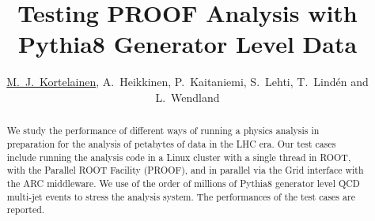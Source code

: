 \documentclass[twoside,floatfix,a4wide]{revtex4}
\begin{document}
\title{Testing PROOF Analysis with Pythia8 Generator Level Data}
\author{\underline{M.~J.~Kortelainen}, A.~Heikkinen, P.~Kaitaniemi, S.~Lehti,
  T.~Lind\'{e}n and L.~Wendland}

\begin{abstract}
  We study the performance of different ways of running a physics
  analysis in preparation for the analysis of petabytes of data in the
  LHC era. Our test cases include running the analysis code in a Linux
  cluster with a single thread in ROOT, with the Parallel ROOT
  Facility (PROOF), and in parallel via the Grid interface with the
  ARC middleware. We use of the order of millions of Pythia8 generator
  level QCD multi-jet events to stress the analysis system. The
  performances of the test cases are reported.
\end{abstract}

\maketitle
\thispagestyle{fancy}






\end{document}

